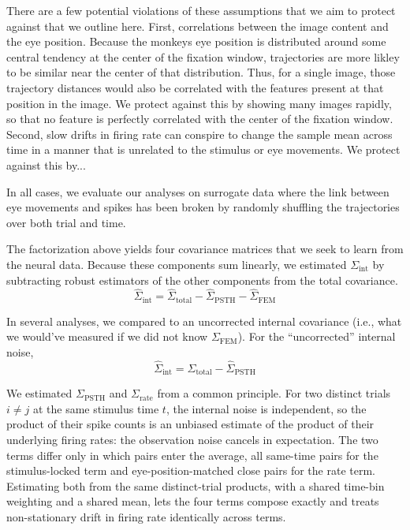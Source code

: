 \documentclass{lite}
\newcommand{\Cpsth}{\Sigma_{\text{PSTH}}}
\newcommand{\Cfem}{\Sigma_{\text{FEM}}}
\newcommand{\Crate}{\Sigma_{\text{rate}}}
\begin{document}
There are a few potential violations of these assumptions that we aim to protect against that we outline here. First, correlations between the image content and the eye position. Because the monkeys eye position is distributed around some central tendency at the center of the fixation window, trajectories are more likley to be similar near the center of that distribution. Thus, for a single image, those trajectory distances would also be correlated with the features present at that position in the image. We protect against this by showing many images rapidly, so that no feature is perfectly correlated with the center of the fixation window.  Second, slow drifts in firing rate can conspire to change the sample mean across time in a manner that is unrelated to the stimulus or eye movements. We protect against this by...

In all cases, we evaluate our analyses on surrogate data where the link between eye movements and spikes has been broken by randomly shuffling the trajectories over both trial and time.


The factorization above yields four covariance matrices that we seek to learn from the neural data. Because these components sum linearly, we estimated $\Sigma_{\text{int}}$ by subtracting robust estimators of the other components from the total covariance.
\begin{equation}
    \hat{\Sigma}_{\text{int}} = \hat{\Sigma}_{\text{total}} - \hat{\Sigma}_{\text{PSTH}} - \hat{\Sigma}_{\text{FEM}}
\end{equation}

In several analyses, we compared to an uncorrected internal covariance (i.e., what we would've measured if we did not know $\Cfem$). For the ``uncorrected'' internal noise, 
\begin{equation}
    \hat{\Sigma}_{\text{int}} = \hat{\Sigma}_{\text{total}} - \hat{\Sigma}_{\text{PSTH}}
\end{equation}

We estimated $\Cpsth$ and $\Crate$ from a common principle. For two distinct trials $i \neq j$ at the same stimulus time $t$, the internal noise is independent, so the product of their spike counts is an unbiased estimate of the product of their underlying firing rates: the observation noise cancels in expectation. The two terms differ only in which pairs enter the average, all same-time pairs for the stimulus-locked term and eye-position-matched close pairs for the rate term. Estimating both from the same distinct-trial products, with a shared time-bin weighting and a shared mean, lets the four terms compose exactly and treats non-stationary drift in firing rate identically across terms.
\end{document}
